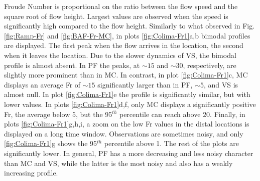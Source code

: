 \documentclass{article}
\begin{document}
Froude Number is proportional on the ratio between the flow speed and the square root of flow height. Largest values are observed when the speed is significantly high compared to the flow height. Similarly to what observed in Fig. \ref{fig:Ramp-Fr} and \ref{fig:BAF-Fr-MC}, in plots \ref{fig:Colima-Fr1}a,b bimodal profiles are displayed. The first peak when the flow arrives in the location, the second when it leaves the location. Due to the slower dynamics of VS, the bimodal profile is almost absent. In PF the peaks, at $\sim 15$ and $\sim 30$, respectively, are slightly more prominent than in MC. In contrast, in plot \ref{fig:Colima-Fr1}c, MC displays an average Fr of $\sim 15$ significantly larger than in PF, $\sim 5$, and VS is almost null. In plot \ref{fig:Colima-Fr1}e the profile is significantly similar, but with lower values. In plots \ref{fig:Colima-Fr1}d,f, only MC displays a significantly positive Fr, the average below $5$, but the 95$^{th}$ percentile can reach above $20$. Finally, in plots \ref{fig:Colima-Fr1}g,h,i, a zoom on the low Fr values in the distal locations is displayed on a long time window. Observations are sometimes noisy, and only \ref{fig:Colima-Fr1}g shows the 95$^{th}$ percentile above 1. The rest of the plots are significantly lower. In general, PF has a more decreasing and less noisy character than MC and VS, while the latter is the most noisy and also has a weakly increasing profile.
\end{document}
